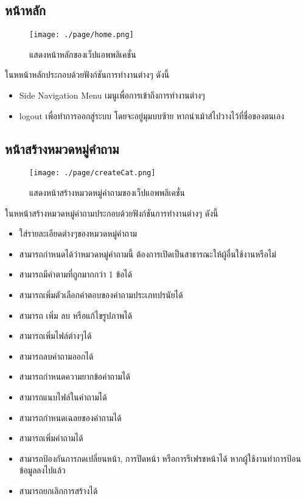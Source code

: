 \subsection{หน้าหลัก}
\begin{figure}[H]
  \centering
  \texttt{[image: ./page/home.png]}
  \caption{แสดงหน้าหลักของเว็ปแอพพลิเคชั่น}
  \label{Fig:Homepage}
\end{figure}
ในหหน้าหลักประกอบด้วยฟังก์ชันการทำงานต่างๆ ดังนี้
\begin{itemize}
  \item Side Navigation Menu เมนูเพื่อการเข้าถึงการทำงานต่างๆ
  \item logout เพื่อทำการออกสู่ระบบ โดยจะอยู่มุมบบซ้าย หากนำเม้าส์ไปวางไว้ที่ชื่อของตนเอง
\end{itemize}

\subsection{หน้าสร้างหมวดหมู่คำถาม}
\begin{figure}[H]
  \centering
  \texttt{[image: ./page/createCat.png]}
  \caption{แสดงหน้าสร้างหมวดหมู่คำถามของเว็ปแอพพลิเคชั่น}
  \label{Fig:createCat}
\end{figure}
ในหหน้าสร้างหมวดหมู่คำถามประกอบด้วยฟังก์ชันการทำงานต่างๆ ดังนี้
\begin{itemize}
  \item ใส่รายละเอียดต่างๆของหมวดหมู่คำถาม
  \item สามารถกำหนดได้ว่าหมวดหมู่คำถามนี้ ต้องการเปิดเป็นสาธารณะให้ผู้อื่นใช้งานหรือไม่
  \item สามารถมีคำตามที่ถูกมากกว่า 1 ข้อได้
  \item สามารถเพิ่มตัวเลือกคำตอบของคำถามประเภทปรนัยได้
  \item สามารถ เพิ่ม ลบ หรือแก้ไขรูปภาพได้
  \item สามารถเพิ่มไฟล์ต่างๆได้
  \item สามารถลบคำถามออกได้
  \item สามารถกำหนดความยากข้อคำถามได้
  \item สามารถแนบไฟล์ในคำถามได้
  \item สามารถกำหนดเฉลยของคำถามได้
  \item สามารถเพิ่มคำถามได้
  \item สามารถป้องกันการกดเปลี่ยนหน้า, การปิดหน้า หรือการรีเฟรชหน้าได้ หากผู้ใช้งานทำการป้อนข้อมูลลงไปแล้ว
  \item สามารถยกเลิกการสร้างได้
\end{itemize}

